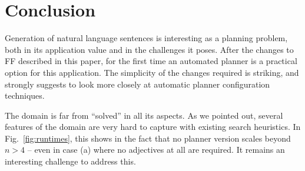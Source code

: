 
\section{Conclusion} \label{sec:conclusion}


Generation of natural language sentences is interesting as a planning
problem, both in its application value and in the challenges it
poses. After the changes to FF described in this paper, for the first
time an automated planner is a practical option for this
application. The simplicity of the changes required is striking, and
strongly suggests to look more closely at automatic planner
configuration techniques.


The domain is far from ``solved'' in all its aspects. As we pointed
out, several features of the domain are very hard to capture with
existing search heuristics. In Fig.~\ref{fig:runtimes}, this shows in
the fact that no planner version scales beyond $n>4$ -- even in case
(a) where no adjectives at all are required. It remains an interesting
challenge to address this.






